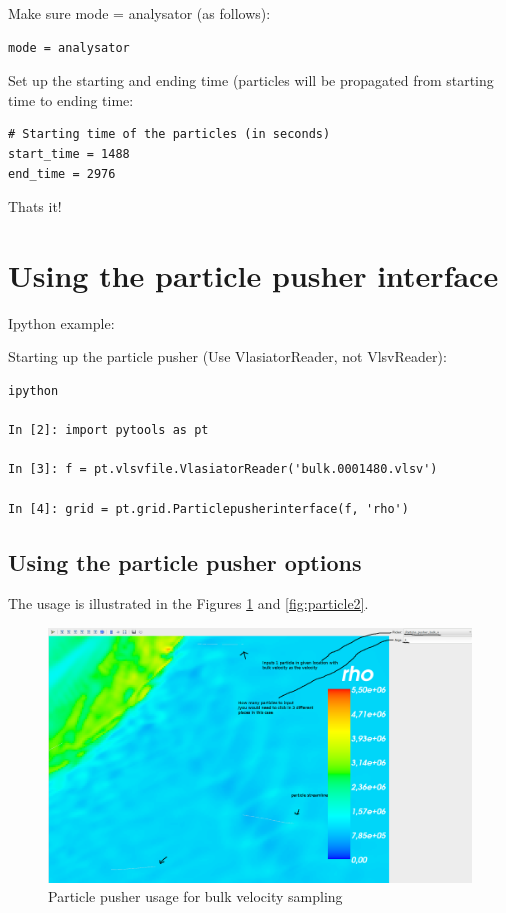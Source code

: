 \documentclass[a4paper,10pt]{article}
\begin{document}
Make sure mode = analysator (as follows):
\begin{verbatim}
mode = analysator
\end{verbatim}

Set up the starting and ending time (particles will be propagated from starting time to ending time:

\begin{verbatim}
# Starting time of the particles (in seconds)
start_time = 1488
end_time = 2976
\end{verbatim}

Thats it!

\section{Using the particle pusher interface}

Ipython example:

Starting up the particle pusher (Use VlasiatorReader, not VlsvReader):

\begin{verbatim}
ipython

In [2]: import pytools as pt

In [3]: f = pt.vlsvfile.VlasiatorReader('bulk.0001480.vlsv')

In [4]: grid = pt.grid.Particlepusherinterface(f, 'rho')
\end{verbatim}

\subsection{Using the particle pusher options}

The usage is illustrated in the Figures \ref{fig:particle1} and \ref{fig:particle2}.

\begin{figure}[H]
 \centering
 \includegraphics[width=\textwidth]{../images/particlepusherbulk.png}
 \caption{Particle pusher usage for bulk velocity sampling}
 \label{fig:particle1}
\end{figure}
\end{document}
